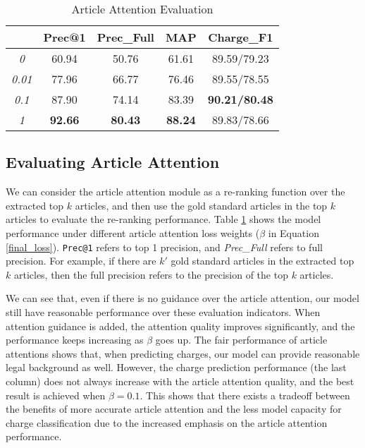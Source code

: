 \begin{table}
\centering
\normalsize{
\begin{tabular}{|c|c|c|c|c|}
\hline
\bm{$\beta$}			& \textbf{Prec@1} 			& \textbf{Prec\_Full} 			& \textbf{MAP} 			& \textbf{Charge\_F1} \\
\hline
\textit{0} 								& 60.94									& 50.76  									& 61.61 						& 89.59/79.23 	\\
\hline
\textit{0.01} 						& 77.96									& 66.77  									& 76.46							& 89.55/78.55 	\\
\hline
\textit{0.1} 							& 87.90									& 74.14  									& 83.39							& \textbf{90.21/80.48} 	\\
\hline
\textit{1} 								& \textbf{92.66}				& \textbf{80.43}  				& \textbf{88.24}		& 89.83/78.66 	\\
\hline
\end{tabular}
}
\caption{Article Attention Evaluation}
\label{tab_article_att}
\end{table}

\subsection{Evaluating Article Attention}
We can consider the article attention module as a re-ranking function over the extracted top $k$ articles, and then use the gold standard articles in the top $k$ articles to evaluate the re-ranking performance. Table \ref{tab_article_att} shows the model performance under different article attention loss weights ($\beta$ in Equation \ref{final_loss}). \texttt{Prec@1} refers to top 1 precision, and \emph{Prec\_Full} refers to full precision. For example, if there are $k'$ gold standard articles in the extracted top $k$ articles, then the full precision refers to the precision of the top $k$ articles.

We can see that, even if there is no guidance over the article attention, our model still have reasonable performance over these evaluation indicators. When attention guidance is added, the attention quality improves significantly, and the performance keeps increasing as $\beta$ goes up.
The fair performance of article attentions shows that, when predicting charges, our model can provide reasonable legal background as well.
However, the charge prediction performance (the last column) does not always increase with the article attention quality, and the best result is achieved when $\beta=0.1$. This shows that there exists a tradeoff between the benefits of more accurate article attention and the less model capacity for charge classification due to the increased emphasis on the article attention performance.


